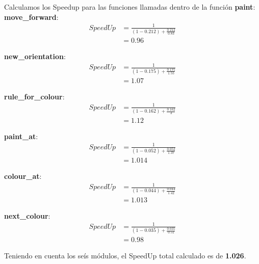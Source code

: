 \documentclass[a4paper, 10pt, twoside, notitlepage]{article}
\begin{document}
 Calculamos los Speedup para las funciones llamadas dentro de la función \textbf{paint}:\\
 
\textbf{move\_forward}:
\begin{equation*} 
\begin{split}
 SpeedUp & =\frac{1}{(1-0.212) + \frac{0.212}{0.83}} \\
  &= 0.96
\end{split}
\end{equation*}

\textbf{new\_orientation}:
\begin{equation*} 
\begin{split}
 SpeedUp &=\frac{1}{(1-0.175) + \frac{0.175}{1.55}} \\
  &= 1.07
\end{split}
\end{equation*}

\textbf{rule\_for\_colour}:
\begin{equation*} 
\begin{split}
 SpeedUp &=\frac{1}{(1-0.162) + \frac{0.162}{3}} \\
  &= 1.12
\end{split}
\end{equation*}

\textbf{paint\_at}:
\begin{equation*} 
\begin{split}
 SpeedUp &=\frac{1}{(1-0.052) + \frac{0.052}{1.37}} \\
  &= 1.014
\end{split}
\end{equation*}

\textbf{colour\_at}:
\begin{equation*} 
\begin{split}
 SpeedUp &=\frac{1}{(1-0.044) + \frac{0.044}{1.42}} \\
  &= 1.013
\end{split}
\end{equation*}

\textbf{next\_colour}:
\begin{equation*} 
\begin{split}
 SpeedUp &=\frac{1}{(1-0.035) + \frac{0.035}{0.51}} \\
  &= 0.98
\end{split}
\end{equation*}

Teniendo en cuenta los seís módulos, el SpeedUp total calculado es de \textbf{1.026}.
\newpage
\end{document}
